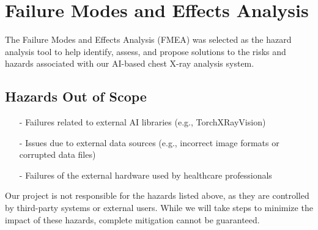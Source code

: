 \documentclass{article}
\begin{document}
\section{Failure Modes and Effects Analysis}
The Failure Modes and Effects Analysis (FMEA) was selected as the hazard analysis tool to help identify, assess, and propose solutions to the risks and hazards associated with our AI-based chest X-ray analysis system.

\subsection{Hazards Out of Scope}
\begin{itemize}
    \item[-] Failures related to external AI libraries (e.g., TorchXRayVision)
    \item[-] Issues due to external data sources (e.g., incorrect image formats or corrupted data files)
    \item[-] Failures of the external hardware used by healthcare professionals
\end{itemize}
Our project is not responsible for the hazards listed above, as they are controlled by third-party systems or external users. While we will take steps to minimize the impact of these hazards, complete mitigation cannot be guaranteed.
\end{document}
